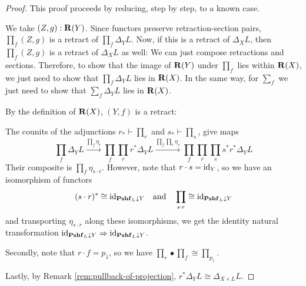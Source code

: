 \begin{proof}
  This proof proceeds by reducing, step by step, to a known case.

  We take $ (Z, g) : \mathbf{R}(Y) $. Since functors preserve retraction-section pairs, $ \prod_f(Z, g) $ is a retract of $ \prod_f \Delta_Y L $. Now, if this is a retract of $ \Delta_X L $, then $ \prod_f(Z, g) $ is a retract of $ \Delta_X L $ as well: We can just compose retractions and sections. Therefore, to show that the image of $ \mathbf{R}(Y) $ under $ \prod_f $ lies within $ \mathbf{R}(X) $, we just need to show that $ \prod_f \Delta_Y L $ lies in $ \mathbf{R}(X) $. In the same way, for $ \sum_f $ we just need to show that $ \sum_f \Delta_Y L $ lies in $ \mathbf{R}(X) $.

  By the definition of $ \mathbf{R}(X) $, $ (Y, f) $ is a retract:
  \begin{center}
  \end{center}

  The counits of the adjunctions $ r_* \vdash \prod_r $ and $ s_* \vdash \prod_s $, give maps
  \[
    \prod_f \Delta_Y L \xrightarrow{\prod_f \eta_r}
    \prod_f \prod_r r^* \Delta_Y L \xrightarrow{\prod_f \prod_r \eta_s}
    \prod_f \prod_r \prod_s s^* r^* \Delta_Y L
  \]
  Their composite is $ \prod_f \eta_{s \cdot r} $. However, note that $ r \cdot s = \text{id}_{Y} $, so we have an isomorphism of functors
  \[ (s \cdot r)^* \cong \text{id}_{\mathbf{Pshf}_{L} \downarrow Y} \quad \text{and} \quad \prod_{s \cdot r} \cong \text{id}_{\mathbf{Pshf}_{L} \downarrow Y} \]
  and transporting $ \eta_{s \cdot r} $ along these isomorphisms, we get the identity natural transformation $ \text{id}_{\mathbf{Pshf}_{L} \downarrow Y} \Rightarrow \text{id}_{\mathbf{Pshf}_{L} \downarrow Y} $.

  Secondly, note that $ r \cdot f = p_1 $, so we have $ \prod_r \bullet \prod_f \cong \prod_{p_1} $.

  Lastly, by Remark \ref{rem:pullback-of-projection}, $ r^* \Delta_Y L \cong \Delta_{X \times L} L $.


\end{proof}
